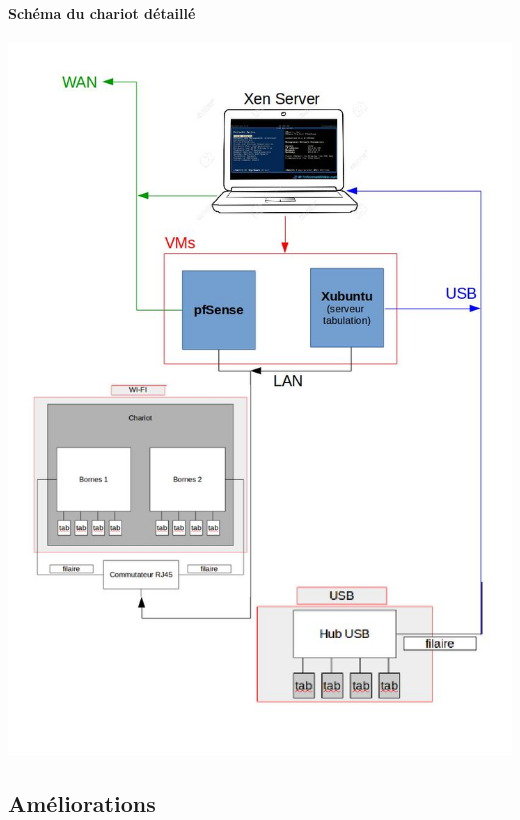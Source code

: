 \documentclass[a4paper,12pt]{extarticle}
\begin{document}
\paragraph{Schéma du chariot détaillé}
\begin{center}
\includegraphics[scale=0.65]{chariot}\\
\end{center}

\subsection{Améliorations}
\end{document}
